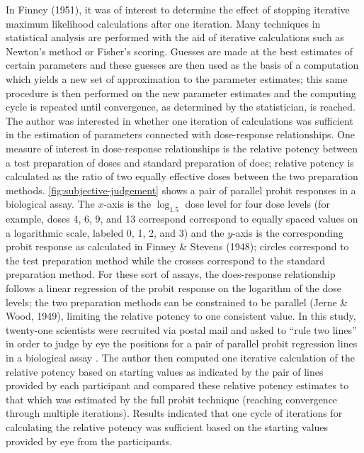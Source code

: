 \documentclass[print]{nuthesis}
\begin{document}
In Finney (1951), it was of interest to determine the effect of stopping iterative maximum likelihood calculations after one iteration.
Many techniques in statistical analysis are performed with the aid of iterative calculations such as Newton's method or Fisher's scoring.
Guesses are made at the best estimates of certain parameters and these guesses are then used as the basis of a computation which yields a new set of approximation to the parameter estimates; this same procedure is then performed on the new parameter estimates and the computing cycle is repeated until convergence, as determined by the statistician, is reached.
The author was interested in whether one iteration of calculations was sufficient in the estimation of parameters connected with dose-response relationships.
One measure of interest in dose-response relationships is the relative potency between a test preparation of doses and standard preparation of does; relative potency is calculated as the ratio of two equally effective doses between the two preparation methods.
\cref{fig:subjective-judgement} shows a pair of parallel probit responses in a biological assay.
The \(x\)-axis is the \(\log_{1.5}\) dose level for four dose levels (for example, doses 4, 6, 9, and 13 correspond correspond to equally spaced values on a logarithmic scale, labeled 0, 1, 2, and 3) and the \(y\)-axis is the corresponding probit response as calculated in Finney \& Stevens (1948); circles correspond to the test preparation method while the crosses correspond to the standard preparation method.
For these sort of assays, the does-response relationship follows a linear regression of the probit response on the logarithm of the dose levels; the two preparation methods can be constrained to be parallel (Jerne \& Wood, 1949), limiting the relative potency to one consistent value.
In this study, twenty-one scientists were recruited via postal mail and asked to ``rule two lines'' in order to judge by eye the positions for a pair of parallel probit regression lines in a biological assay .
The author then computed one iterative calculation of the relative potency based on starting values as indicated by the pair of lines provided by each participant and compared these relative potency estimates to that which was estimated by the full probit technique (reaching convergence through multiple iterations).
Results indicated that one cycle of iterations for calculating the relative potency was sufficient based on the starting values provided by eye from the participants.
\end{document}
